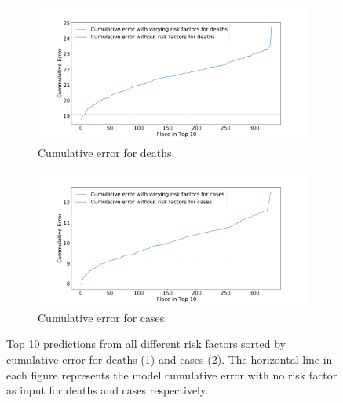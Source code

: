 \documentclass[a4paper, inpress]{jds} %
\renewcommand{\_}{%
    \textunderscore\hspace{0pt}%
}
\begin{document}
\begin{figure}[!htbp]
    \begin{subfigure}{.95\textwidth}
        \centering
        \includegraphics[width=1.0\textwidth]{images/predict/PlaceTop10_DeathNEW3.pdf}
        \caption{Cumulative error for deaths.}
        \label{fig:place-top10-death}
    \end{subfigure}
    \begin{subfigure}{.95\textwidth}
        \centering
        \includegraphics[width=1.0\textwidth]{images/predict/PlaceTop10_CasesNEW3.pdf}
        \caption{Cumulative error for cases.}
        \label{fig:place-top10-cases}
    \end{subfigure}

    \caption{Top 10 predictions from all different risk factors sorted by cumulative error for deaths (\ref{fig:place-top10-death}) and cases (\ref{fig:place-top10-cases}). The horizontal line in each figure represents the model cumulative error with no risk factor as input for deaths and cases respectively.}
    \label{fig:place-top10-both}
    
    
\end{figure}
\end{document}
